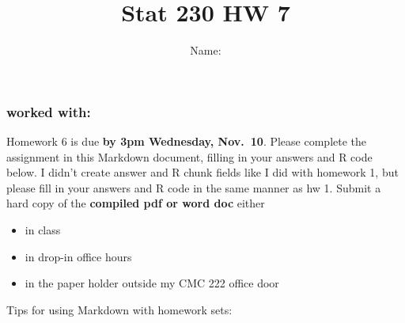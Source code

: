 \documentclass[
]{article}
\title{Stat 230 HW 7}
\author{Name:}
\date{}
\providecommand{\tightlist}{%
  \setlength{\itemsep}{0pt}\setlength{\parskip}{0pt}}
\begin{document}
\maketitle

\hypertarget{worked-with}{%
\subsubsection{worked with:}\label{worked-with}}

Homework 6 is due \textbf{by 3pm Wednesday, Nov.~10}. Please complete
the assignment in this Markdown document, filling in your answers and R
code below. I didn't create answer and R chunk fields like I did with
homework 1, but please fill in your answers and R code in the same
manner as hw 1. Submit a hard copy of the \textbf{compiled pdf or word
doc} either

\begin{itemize}
\tightlist
\item
  in class
\item
  in drop-in office hours
\item
  in the paper holder outside my CMC 222 office door
\end{itemize}

Tips for using Markdown with homework sets:
\end{document}
